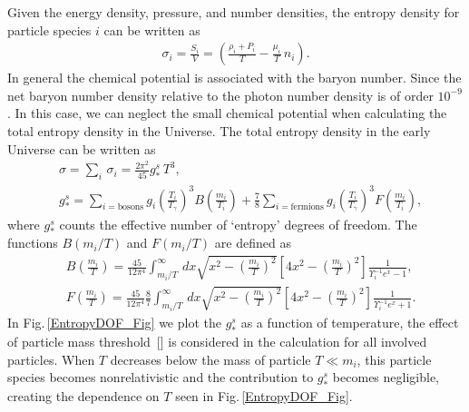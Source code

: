 Given the energy density, pressure, and number densities, the entropy density for particle species $i$ can be written as
\begin{align}\label{entropy}
\sigma_i=\frac{S_i}{V}=\left(\frac{\rho_i+P_i}{T}-\frac{\mu_i}{T}\,n_i\right).
\end{align}
In general the chemical potential is associated with the baryon number. Since the net baryon number density relative to the photon number density is of order $10^{-9}$. In this case, we can neglect the small chemical potential when calculating the total entropy density in the Universe. The total entropy density in the early Universe can be written as
\begin{align}
&\sigma=\sum_i\,\sigma_i=\frac{2\pi^2}{45}g^s_\ast\,T^3,\\
&g^s_\ast=\sum_{i=\mathrm{bosons}}g_i\left({\frac{T_i}{T_\gamma}}\right)^3B\left(\frac{m_i}{T_i}\right)+\frac{7}{8}\sum_{i=\mathrm{fermions}}g_i\left({\frac{T_i}{T_\gamma}}\right)^3F\left(\frac{m_i}{T_i}\right),
\end{align}
where $g^s_\ast$ counts the effective number of `entropy' degrees of freedom. The functions $B(m_i/T)$ and $F(m_i/T)$ are defined as
\begin{align}
&B\left(\frac{m_i}{T}\right)=\frac{45}{12\pi^4}\int^\infty_{m_i/T}\,dx\sqrt{x^2-\left(\frac{m_i}{T}\right)^2}\left[4x^2-\left(\frac{m_i}{T}\right)^2\right]\frac{1}{\Upsilon^{-1}_ie^x-1},\\
&F\left(\frac{m_i}{T}\right)=\frac{45}{12\pi^4}\frac{8}{7}\int^\infty_{m_i/T}\,dx\sqrt{x^2-\left(\frac{m_i}{T}\right)^2}\left[4x^2-\left(\frac{m_i}{T}\right)^2\right]\frac{1}{\Upsilon^{-1}_ie^x+1}.
\end{align}
In Fig.\,\ref{EntropyDOF_Fig} we plot the $g^s_\ast$ as a function of temperature, the effect of particle mass threshold~[\cite{Coc:2006rt}] is considered in the calculation for all involved particles. When $T$ decreases below the mass of particle $T\ll m_i$, this particle species becomes nonrelativistic and the contribution to $g^s_\ast$ becomes negligible, creating the dependence on $T$ seen in Fig.\,\ref{EntropyDOF_Fig}.
